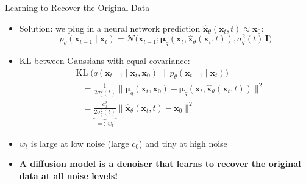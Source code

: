 \documentclass[11pt,compress,t,notes=noshow, xcolor=table]{beamer}
\providecommand{\bx}{\mathbf{x}}
\begin{document}
\begin{frame}{Learning to Recover the Original Data}

\vfill

\begin{itemize}
\item Solution: we plug in a neural network prediction $\hat{\bx}_\theta(\bx_t, t) \approx \bx_0$:
\begin{equation*}
p_\theta(\bx_{t-1} \mid \bx_t) = \mathcal{N}\big(\bx_{t-1}; \boldsymbol{\mu}_q(\bx_t, \hat{\bx}_\theta(\bx_t, t)), \sigma_q^2(t)\, \mathbf{I}\big)
\end{equation*}
\item KL between Gaussians with equal covariance:
\begin{align*}
&\operatorname{KL}\big(q(\bx_{t-1} \mid \bx_t, \bx_0) \,\|\, p_\theta(\bx_{t-1} \mid \bx_t)\big)\\
&\quad = \frac{1}{2\sigma_q^2(t)} \big\| \boldsymbol{\mu}_q(\bx_t, \bx_0) - \boldsymbol{\mu}_q(\bx_t, \hat{\bx}_\theta(\bx_t, t)) \big\|^2\\
&\quad = \underbrace{\frac{c_0^2}{2\sigma_q^2(t)}}_{=:\, w_t} \big\| \hat{\bx}_\theta(\bx_t, t) - \bx_0 \big\|^2
\end{align*}
\item $w_t$ is large at low noise (large $c_0$) and tiny at high noise
\item \textbf{A diffusion model is a denoiser that learns to recover the original data at all noise levels!}
\end{itemize}

\vfill

\end{frame}
 
 
\end{document}

